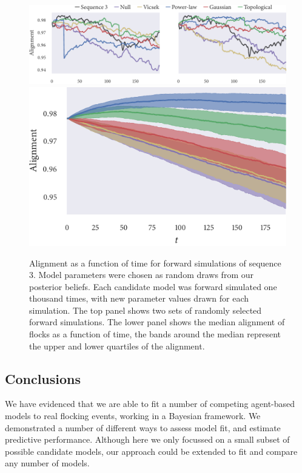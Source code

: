\begin{figure}[tbp]
  \includegraphics{alignment/alignment_single_3.pdf}\vspace{1em}\\
  \includegraphics{alignment/alignment_ensemble_3.pdf}
  \caption{Alignment as a function of time for forward simulations of sequence
    $3$. Model parameters were chosen as random draws from our posterior
    beliefs. Each candidate model was forward simulated one thousand times,
    with new parameter values drawn for each simulation. The top panel shows two
    sets of randomly selected forward simulations. The lower panel shows the
    median alignment of flocks as a function of time, the bands around the
    median represent the upper and lower quartiles of the alignment.}
  \label{fig:checks_seq3}
\end{figure}

\subsection*{Conclusions}

We have evidenced that we are able to fit a number of competing agent-based
models to real flocking events, working in a Bayesian framework. We
demonstrated a number of different ways to assess model fit, and estimate
predictive performance. Although here we only focussed on a small subset of
possible candidate models, our approach could be extended to fit and compare
any number of models.

